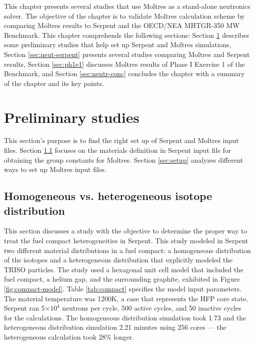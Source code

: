 \label{ch:neutronics}

This chapter presents several studies that use Moltres as a stand-alone neutronics solver.
The objective of the chapter is to validate Moltres calculation scheme by comparing Moltres results to Serpent and the OECD/NEA MHTGR-350 MW Benchmark.
This chapter comprehends the following sections: Section \ref{sec:neut-prelim} describes some preliminary studies that help set up Serpent and Moltres simulations, Section \ref{sec:neut-serpent} presents several studies comparing Moltres and Serpent results, Section \ref{sec:ph1e1} discusses Moltres results of Phase I Exercise 1 of the Benchmark, and Section \ref{sec:neutr-conc} concludes the chapter with a summary of the chapter and its key points.

\section{Preliminary studies}
\label{sec:neut-prelim}

This section's purpose is to find the right set up of Serpent and Moltres input files.
Section \ref{sec:homo-hetero} focuses on the materials definition in Serpent input file for obtaining the group constants for Moltres.
Section \ref{sec:setup} analyzes different ways to set up Moltres input files.

\subsection{Homogeneous vs. heterogeneous isotope distribution}
\label{sec:homo-hetero}

This section discusses a study with the objective to determine the proper way to treat the fuel compact heterogeneities in Serpent.
This study modeled in Serpent two different material distributions in a fuel compact: a homogeneous distribution of the isotopes and a heterogeneous distribution that explicitly modeled the TRISO particles.
The study used a hexagonal unit cell model that included the fuel compact, a helium gap, and the surrounding graphite, exhibited in Figure \ref{fig:compact-model}.
Table \ref{tab:compact} specifies the model input parameters.
The material temperature was 1200K, a case that represents the \gls{HFP} core state.
Serpent ran 5$\times 10^4$ neutrons per cycle, 500 active cycles, and 50 inactive cycles for the calculations.
The homogeneous distribution simulation took 1.73 and the heterogeneous distribution simulation 2.21 minutes using 256 cores --- the heterogeneous calculation took 28$\%$ longer.

